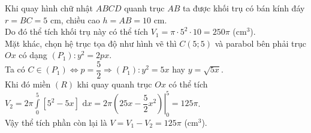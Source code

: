 \begin{ex}
{\begin{center}
\end{center}
Khi quay hình chữ nhật $ABCD$ quanh trục $AB$ ta được khối trụ có bán kính đáy $r=BC=5$ cm, chiều cao $h=AB=10$ cm.\\
Do đó thể tích khối trụ này có thể tích $V_1=\pi \cdot 5^2\cdot 10=250\pi$ (cm$^3$).\\
Mặt khác, chọn hệ trục tọa độ như hình vẽ thì $C(5;5)$ và parabol bên phải trục $Ox$ có dạng $(P_1)\colon y^2=2px$.\\
Ta có $C\in (P_1)\Leftrightarrow p=\dfrac{5}{2}
\Rightarrow (P_1)\colon y^2=5x$ hay $y=\sqrt{5x}$.\\
Khi đó miền $(R)$ khi quay quanh trục $Ox$ có thể tích $V_2=2\pi \displaystyle \int\limits_0^5 \left[ {5^2}-5x \right]\,\mathrm{\,d}x=2\pi \left. \left( 25x-\dfrac{5}{2}{x^2} \right) \right|_0^5=125\pi $.\\
Vậy thể tích phần còn lại là $V=V_1-V_2=125\pi$ (cm$^3$).\\
}
\end{ex}

